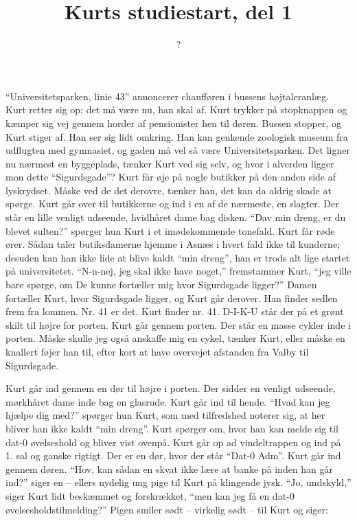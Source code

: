 \documentclass[a4paper,11pt]{article}
\title{Kurts studiestart, del 1}
\author{?}
\begin{document}
\maketitle

%


\begin{sketch}

``Universitetsparken, linie 43'' annoncerer chaufføren i bussens højtaleranlæg. Kurt retter sig op; det må være nu, han skal af. Kurt trykker på stopknappen og kæmper sig vej gennem horder af pensionister hen til døren. Bussen stopper, og Kurt stiger af. Han ser sig lidt omkring. Han kan genkende zoologisk museum fra udflugten med gymnasiet, og gaden må vel så være Universitetsparken. Det ligner nu nærmest en byggeplads, tænker Kurt ved sig selv, og hvor i alverden ligger mon dette ``Sigurdsgade''? Kurt får øje på nogle butikker på den anden side af lyskrydset. Måske ved de det derovre, tænker han, det kan da aldrig skade at spørge. Kurt går over til butikkerne og ind i en af de nærmeste, en slagter. Der står en lille venligt udseende, hvidhåret dame bag disken. ``Dav min dreng, er du blevet sulten?'' spørger hun Kurt i et imødekommende tonefald. Kurt får røde ører. Sådan taler butiksdamerne hjemme i Asnæs i hvert fald ikke til kunderne; desuden kan han ikke lide at blive kaldt ``min dreng'', han er trods alt lige startet på universitetet. ``N-n-nej, jeg skal ikke have noget,'' fremstammer Kurt, ``jeg ville bare spørge, om De kunne fortæller mig hvor Sigurdsgade ligger?'' Damen fortæller Kurt, hvor Sigurdsgade ligger, og Kurt går derover. Han finder sedlen frem fra lommen. Nr. 41 er det. Kurt finder nr. 41. D-I-K-U står der på et grønt skilt til højre for porten. Kurt går gennem porten. Der står en masse cykler inde i porten. Måske skulle jeg også anskaffe mig en cykel, tænker Kurt, eller måske en knallert føjer han til, efter kort at have overvejet afstanden fra Valby til Sigurdsgade.

Kurt går ind gennem en dør til højre i porten. Der sidder en venligt udseende, mørkhåret dame inde bag en glasrude. Kurt går ind til hende. ``Hvad kan jeg hjælpe dig med?'' spørger hun Kurt, som med tilfredshed noterer sig, at her bliver han ikke kaldt ``min dreng''. Kurt spørger om, hvor han kan melde sig til dat-0 øvelseshold og bliver vist ovenpå. Kurt går op ad vindeltrappen og ind på 1. sal og ganske rigtigt. Der er en dør, hvor der står ``Dat-0 Adm''. Kurt går ind gennem døren. ``Hov, kan sådan en skvat ikke lære at banke på inden han går ind?'' siger en -- ellers nydelig ung pige til Kurt på klingende jysk. ``Jo, undskyld,'' siger Kurt lidt beskæmmet og forskrækket, ``men kan jeg få en dat-0 øvelsesholdstilmelding?'' Pigen smiler sødt -- virkelig sødt -- til Kurt og siger:


\end{sketch}
\end{document}
